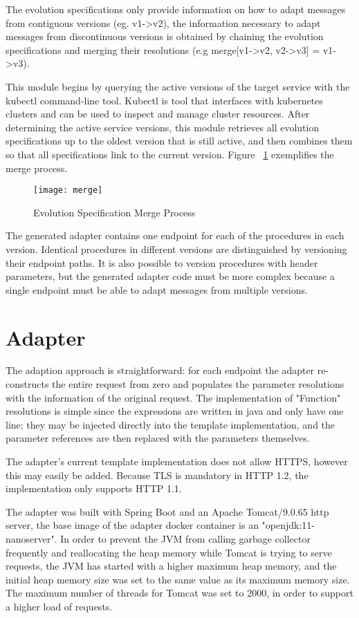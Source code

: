The evolution specifications only provide information on how to adapt messages from contiguous versions (eg. v1->v2),
the information necessary to adapt messages from discontinuous versions is obtained by chaining the evolution specifications and
merging their resolutions (e.g merge[v1->v2, v2->v3] = v1->v3).

This module begins by querying the active versions of the target service with the kubectl command-line tool.
Kubectl is tool that interfaces with kubernetes clusters and can be used to inspect and manage cluster resources.
After determining the active service versions, this module retrieves all evolution specifications up to the oldest version that is still active,
and then combines them so that all specifications link to the current version. Figure ~\ref{fig:merge} exemplifies the merge process.

\begin{figure}[htbp]
    \centering
    \texttt{[image: merge]}
    \caption{Evolution Specification Merge Process}
    \label{fig:merge}
\end{figure}

The generated adapter contains one endpoint for each of the procedures in each version.
Identical procedures in different versions are distinguished by versioning their endpoint paths.
It is also possible to version procedures with header parameters,
but the generated adapter code must be more complex because a single endpoint must be able to adapt messages from multiple versions.

\section{Adapter} %
\label{sec:adapter}

The adaption approach is straightforward: for each endpoint the
adapter re-constructs the entire request from zero and populates the parameter resolutions with the information of the original request.
The implementation of "Function" resolutions is simple since the expressions are written in java and only have one line;
they may be injected directly into the template implementation, and the parameter references are then replaced with the parameters themselves.

The adapter's current template implementation does not allow HTTPS, however this may easily be added.
Because TLS is mandatory in HTTP 1.2, the implementation only supports HTTP 1.1.

The adapter was built with Spring Boot and an Apache Tomcat/9.0.65 http server, the base image of the adapter docker container is an "openjdk:11-nanoserver".
In order to prevent the JVM from calling garbage collector frequently and reallocating the heap memory while Tomcat is trying to serve requests,
the JVM has started with a higher maximum heap memory, and the initial heap memory
size was set to the same value as its maximum memory size.
The maximum number of threads for Tomcat was set to 2000, in order to support a higher load of requests.

